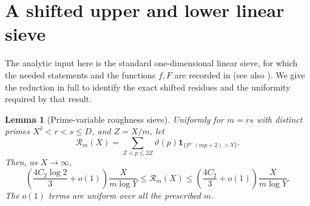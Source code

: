 \documentclass[11pt]{article}
\newtheorem{lemma}[theorem]{Lemma}
\newcommand{\one}{\mathbf 1}
\newcommand{\phimin}{P^-}
\newcommand{\thetap}{\vartheta}
\begin{document}
\section{A shifted upper and lower linear sieve}

The analytic input here is the standard one-dimensional linear
sieve, for which the needed statements and the functions $f,F$ are
recorded in \cite[Lemma~2.5]{MZA} (see also
\cite{OperaDeCribro}).  We give the reduction in full to identify
the exact shifted residues and the uniformity required by that result.

\begin{lemma}[Prime-variable roughness sieve]\label{lem:sieve}
Uniformly for $m=rs$ with distinct primes
$X^\delta<r<s\le D$, and $Z=X/m$, let
\[
 \mathcal R_m(X)=\sum_{Z<p\le2Z}\thetap(p)
                    \one_{\{\phimin(mp+2)>Y\}}.
\]
Then, as $X\to\infty$,
\begin{equation}\label{eq:permbound}
 \left(\frac{4C_2\log2}{3}+o(1)\right)\frac{X}{m\log Y}
 \le \mathcal R_m(X)
 \le\left(\frac{4C_2}{3}+o(1)\right)\frac{X}{m\log Y}.
\end{equation}
The $o(1)$ terms are uniform over all the prescribed $m$.
\end{lemma}
\end{document}
